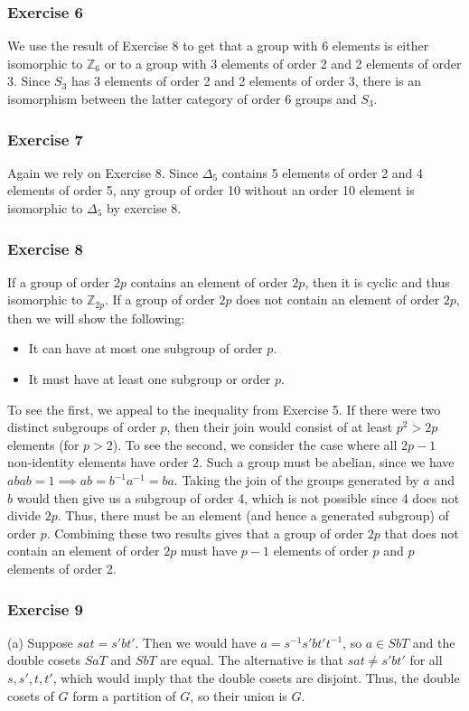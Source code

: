\subsubsection{Exercise 6}
We use the result of Exercise 8 to get that a group with 6 elements is either isomorphic to $\mathbb{Z}_6$ or
to a group with 3 elements of order 2 and 2 elements of order 3. Since $S_3$ has 3 elements of order 2 and
2 elements of order 3, there is an isomorphism between the latter category of order 6 groups and $S_3$.

\subsubsection{Exercise 7}
Again we rely on Exercise 8. Since $\Delta_5$ contains 5 elements of order 2 and 4 elements of order 5,
any group of order 10 without an order 10 element is isomorphic to $\Delta_5$ by exercise 8.

\subsubsection{Exercise 8}
If a group of order $2p$ contains an element of order $2p$, then it is cyclic and thus isomorphic to
$\mathbb{Z}_{2p}$. If a group of order $2p$ does not contain an element of order $2p$, then we will show
the following:
\begin{itemize}
  \item It can have at most one subgroup of order $p$.
  \item It must have at least one subgroup or order $p$.
\end{itemize}
To see the first, we appeal to the inequality from Exercise 5. If there were two distinct subgroups of order
$p$, then their join would consist of at least $p^2 > 2p$ elements (for $p > 2$). To see the second, we 
consider the case where all  $2p - 1$ non-identity elements have order 2. Such a group must be abelian,
since we have $abab = 1 \implies ab = b^{-1} a^{-1} = ba$. Taking the join of the groups generated by $a$ 
and $b$ would then give us a subgroup of order 4, which is not possible since 4 does not divide $2p$. Thus,
there must be an element (and hence a generated subgroup) of order $p$. Combining these two results gives
that a group of order $2p$ that does not contain an element of order $2p$ must have $p-1$ elements of order
$p$ and $p$ elements of order 2.

\subsubsection{Exercise 9}
(a) Suppose $s a t = s' b t'$. Then we would have  $a = s^{-1} s' b t' t^{-1}$, so $a \in SbT$ and the 
double cosets $SaT$ and $SbT$ are equal. The alternative is that $s a t \neq s' b t'$ for all $s, s', t, t'$,
which would imply that the double cosets are disjoint. Thus, the double cosets of $G$ form a partition of
$G$, so their union is $G$.


